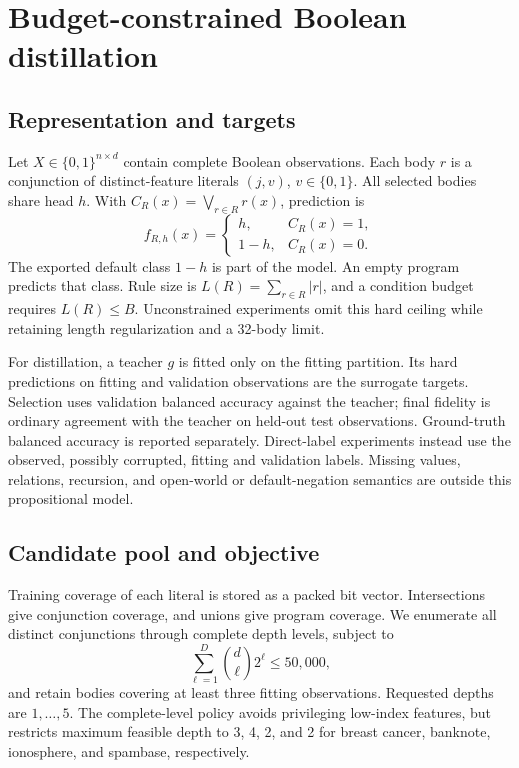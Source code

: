 \documentclass[a4paper,fleqn,review]{cas-sc}
\begin{document}
\section{Budget-constrained Boolean distillation}
\subsection{Representation and targets}
Let $X\in\{0,1\}^{n\times d}$ contain complete Boolean observations. Each body $r$ is a conjunction of distinct-feature literals $(j,v)$, $v\in\{0,1\}$. All selected bodies share head $h$. With $C_R(x)=\bigvee_{r\in R}r(x)$, prediction is
\begin{equation}
 f_{R,h}(x)=\begin{cases}h,& C_R(x)=1,\\1-h,&C_R(x)=0.\end{cases}
\end{equation}
The exported default class $1-h$ is part of the model. An empty program predicts that class. Rule size is $L(R)=\sum_{r\in R}|r|$, and a condition budget requires $L(R)\leq B$. Unconstrained experiments omit this hard ceiling while retaining length regularization and a 32-body limit.

For distillation, a teacher $g$ is fitted only on the fitting partition. Its hard predictions on fitting and validation observations are the surrogate targets. Selection uses validation balanced accuracy against the teacher; final fidelity is ordinary agreement with the teacher on held-out test observations. Ground-truth balanced accuracy is reported separately. Direct-label experiments instead use the observed, possibly corrupted, fitting and validation labels. Missing values, relations, recursion, and open-world or default-negation semantics are outside this propositional model.

\subsection{Candidate pool and objective}
Training coverage of each literal is stored as a packed bit vector. Intersections give conjunction coverage, and unions give program coverage. We enumerate all distinct conjunctions through complete depth levels, subject to
\begin{equation}
 \sum_{\ell=1}^{D}\binom d\ell 2^\ell\leq 50{,}000,
\end{equation}
and retain bodies covering at least three fitting observations. Requested depths are $1,\ldots,5$. The complete-level policy avoids privileging low-index features, but restricts maximum feasible depth to 3, 4, 2, and 2 for breast cancer, banknote, ionosphere, and spambase, respectively.
\end{document}
